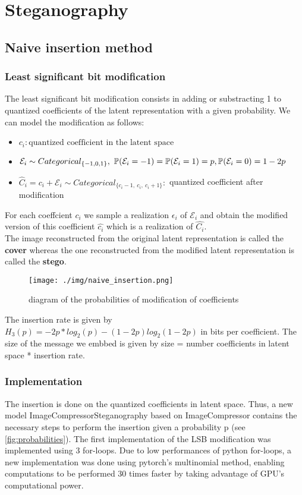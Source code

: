 \documentclass[12pt]{article}
\begin{document}
\section{Steganography}
\subsection{Naive insertion method}
\subsubsection{Least significant bit modification}
The least significant bit modification consists in adding or substracting 1 to quantized coefficients of the latent representation with a given probability. We can model the modification as follows:

\begin{itemize}
    \item $c_i: \text{quantized coefficient in the latent space}$
    \item $\mathcal{E}
    _i \sim Categorical_{\{-1,0,1\}},\\
    \ \mathbb{P}(\mathcal{E}_i = -1) = \mathbb{P}(\mathcal{E}_i = 1) = p,\\
    \mathbb{P}(\mathcal{E}_i = 0) = 1-2p$ 
    \item $\hat{C}_i = c_i + \mathcal{E}_i \sim Categorical_{\{c_i-1,\ c_i,\ c_i+1\}}:$ quantized coefficient after modification
\end{itemize}

For each coeffcient $c_i$ we sample a realization $\epsilon_i$ of $\mathcal{E}_i$ and obtain the modified version of this coefficient $\hat{c_i}$ which is a realization of $\hat{C_i}$.\\
The image reconstructed from the original latent representation is called the \textbf{cover} whereas the one reconstructed from the modified latent representation is called the \textbf{stego}.

\begin{figure}[H]
    \centering
    \texttt{[image: ./img/naive\_insertion.png]}
    \caption[short]{diagram of the probabilities of modification of coefficients}
    \label{fig:probabilities}
\end{figure}
The insertion rate is given by $H_3(p) = -2p*log_2(p) - (1-2p)log_2(1-2p)$ in bits per coefficient. The size of the message we embbed is given by size = number coefficients in latent space * insertion rate.
\subsubsection{Implementation}
The insertion is done on the quantized coefficients in latent space. Thus, a new model ImageCompressorSteganography based on ImageCompressor contains the necessary steps to perform the insertion given a probability p (see \autoref{fig:probabilities}). The first implementation of the LSB modification was implemented using 3 for-loops. Due to low performances of python for-loops, a new implementation was done using pytorch's multinomial method, enabling computations to be performed 30 times faster by taking advantage of GPU's computational power.
\end{document}

